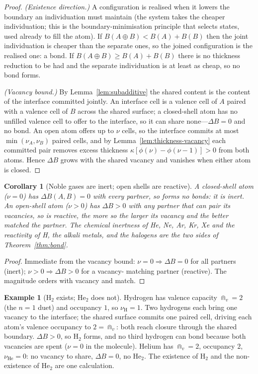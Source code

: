 \documentclass[11pt,a4paper]{article}
\theoremstyle{thmstyle}
\newtheorem{corollary}[theorem]{Corollary}
\theoremstyle{definition}
\newtheorem{example}[theorem]{Example}
\theoremstyle{remark}
\newcommand{\thick}{B}                 %
\newcommand{\vac}{\nu}                 %
\begin{document}
\begin{proof}
\emph{(Existence direction.)} A configuration is realised when it lowers
the boundary an individuation must maintain (the system takes the cheaper
individuation; this is the boundary-minimisation principle that selects
states, used already to fill the atom). If
$\thick(A\!\oplus\!B)<\thick(A)+\thick(B)$ then the joint individuation is
cheaper than the separate ones, so the joined configuration is the
realised one: a bond. If
$\thick(A\!\oplus\!B)\ge\thick(A)+\thick(B)$ there is no thickness reduction
to be had and the separate individuation is at least as cheap, so no bond
forms.

\emph{(Vacancy bound.)} By Lemma~\ref{lem:subadditive} the shared content
is the content of the interface committed jointly. An interface cell is a
valence cell of $A$ paired with a valence cell of $B$ across the shared
surface; a closed-shell atom has no unfilled valence cell to offer to the
interface, so it can share none---$\Delta\thick=0$ and no bond. An open
atom offers up to $\vac$ cells, so the interface commits at most
$\min(\vac_A,\vac_B)$ paired cells, and by
Lemma~\ref{lem:thickness-vacancy} each committed pair removes excess
thickness $\kappa[\phi(\vac)-\phi(\vac-1)]>0$ from both atoms. Hence
$\Delta\thick$ grows with the shared vacancy and vanishes when either
atom is closed.
\end{proof}

\begin{corollary}[Noble gases are inert; open shells are reactive]
\label{cor:noble}
A closed-shell atom ($\vac=0$) has $\Delta\thick(A,B)=0$ with every
partner, so forms no bonds: it is inert. An open-shell atom ($\vac>0$)
has $\Delta\thick>0$ with any partner that can pair its vacancies, so is
reactive, the more so the larger its vacancy and the better matched the
partner. The chemical inertness of He, Ne, Ar, Kr, Xe and the reactivity
of H, the alkali metals, and the halogens are the two sides of
Theorem~\ref{thm:bond}.
\end{corollary}

\begin{proof}
Immediate from the vacancy bound: $\vac=0\Rightarrow\Delta\thick=0$ for
all partners (inert); $\vac>0\Rightarrow\Delta\thick>0$ for a vacancy-
matching partner (reactive). The magnitude orders with vacancy and match.
\end{proof}

\begin{example}[H$_2$ exists; He$_2$ does not]
\label{ex:h2}
Hydrogen has valence capacity $\Cap_v=2$ (the $n=1$ duet) and occupancy
$1$, so $\vac_{\mathrm H}=1$. Two hydrogens each bring one vacancy to the
interface; the shared surface commits one paired cell, driving each
atom's valence occupancy to $2=\Cap_v$: both reach closure through the
shared boundary. $\Delta\thick>0$, so H$_2$ forms, and no third hydrogen
can bond because both vacancies are spent ($\vac=0$ in the molecule).
Helium has $\Cap_v=2$, occupancy $2$, $\vac_{\mathrm{He}}=0$: no vacancy
to share, $\Delta\thick=0$, no He$_2$. The existence of H$_2$ and the
non-existence of He$_2$ are one calculation.
\end{example}
\end{document}
